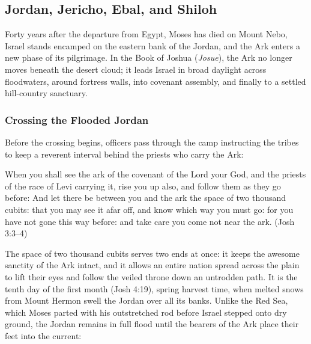\subsection{Jordan, Jericho, Ebal, and Shiloh}
\label{subsec:jordan-jericho-shiloh}

Forty years after the departure from Egypt, Moses has died on Mount Nebo, Israel stands encamped on the eastern bank of the Jordan, and the Ark enters a new phase of its pilgrimage. In the Book of Joshua (\textit{Josue}), the Ark no longer moves beneath the desert cloud; it leads Israel in broad daylight across floodwaters, around fortress walls, into covenant assembly, and finally to a settled hill-country sanctuary.

\subsubsection{Crossing the Flooded Jordan}

Before the crossing begins, officers pass through the camp instructing the tribes to keep a reverent interval behind the priests who carry the Ark:

\begin{scriptureblock}
When you shall see the ark of the covenant of the Lord your God, and the priests of the race of Levi carrying it, rise you up also, and follow them as they go before: And let there be between you and the ark the space of two thousand cubits: that you may see it afar off, and know which way you must go: for you have not gone this way before: and take care you come not near the ark. \textnormal{(Josh 3:3--4)}
\end{scriptureblock}

The space of two thousand cubits serves two ends at once: it keeps the awesome sanctity of the Ark intact, and it allows an entire nation spread across the plain to lift their eyes and follow the veiled throne down an untrodden path. It is the tenth day of the first month (Josh 4:19), spring harvest time, when melted snows from Mount Hermon swell the Jordan over all its banks. Unlike the Red Sea, which Moses parted with his outstretched rod before Israel stepped onto dry ground, the Jordan remains in full flood until the bearers of the Ark place their feet into the current:

